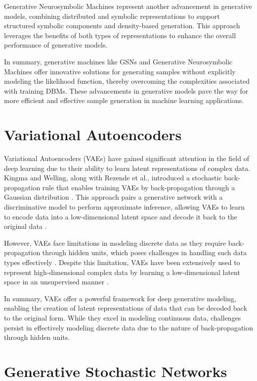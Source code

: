 Generative Neurosymbolic Machines represent another advancement in generative models, combining distributed and symbolic representations to support structured symbolic components and density-based generation. This approach leverages the benefits of both types of representations to enhance the overall performance of generative models.

In summary, generative machines like GSNs and Generative Neurosymbolic Machines offer innovative solutions for generating samples without explicitly modeling the likelihood function, thereby overcoming the complexities associated with training DBMs. These advancements in generative models pave the way for more efficient and effective sample generation in machine learning applications.



\section*{Variational Autoencoders}


Variational Autoencoders (VAEs) have gained significant attention in the field of deep learning due to their ability to learn latent representations of complex data. Kingma and Welling, along with Rezende et al., introduced a stochastic back-propagation rule that enables training VAEs by back-propagation through a Gaussian distribution \citep{10.48550/arxiv.1909.13062}. This approach pairs a generative network with a discriminative model to perform approximate inference, allowing VAEs to learn to encode data into a low-dimensional latent space and decode it back to the original data \citep{10.3390/bioengineering10101209}.

However, VAEs face limitations in modeling discrete data as they require back-propagation through hidden units, which poses challenges in handling such data types effectively \citep{10.48550/arxiv.1909.13062}. Despite this limitation, VAEs have been extensively used to represent high-dimensional complex data by learning a low-dimensional latent space in an unsupervised manner \citep{10.48550/arxiv.2106.06500}.

In summary, VAEs offer a powerful framework for deep generative modeling, enabling the creation of latent representations of data that can be decoded back to the original form. While they excel in modeling continuous data, challenges persist in effectively modeling discrete data due to the nature of back-propagation through hidden units.


\section*{Generative Stochastic Networks}


